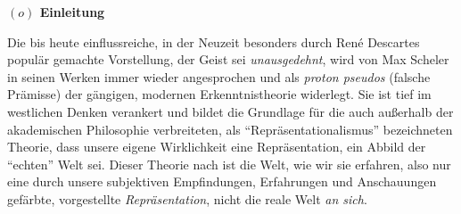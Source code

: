 \documentclass[a4paper, 12pt]{article}
\begin{document}
\begin{onehalfspace} 

\noindent\textbf{$(o)$ Einleitung}

\noindent Die bis heute einflussreiche, in der Neuzeit besonders durch Ren\'e Descartes populär gemachte Vorstellung, der Geist sei \emph{unausgedehnt}, wird von Max Scheler in seinen Werken immer wieder angesprochen und als \emph{proton pseudos} (falsche Prämisse) der gängigen, modernen Erkenntnistheorie widerlegt. Sie ist tief im westlichen Denken verankert und bildet die Grundlage für die auch außerhalb der akademischen Philosophie verbreiteten, als "`Repräsentationalismus"' bezeichneten Theorie, dass unsere eigene Wirklichkeit eine Repräsentation, ein Abbild der "`echten"' Welt sei. Dieser Theorie nach ist die Welt, wie wir sie erfahren, also nur eine durch unsere subjektiven Empfindungen, Erfahrungen und Anschauungen gefärbte, vorgestellte \emph{Repräsentation}, nicht die reale Welt \emph{an sich}.




\end{onehalfspace}
\end{document}
